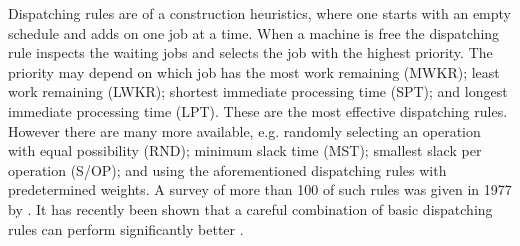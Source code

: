 \documentclass[10pt]{llncs}
\begin{document}

Dispatching rules are of a construction heuristics, where one starts with an empty schedule and adds on one job at a time. When a machine is free the dispatching rule inspects the waiting jobs and selects the job with the highest priority. The priority may depend on which job has the most work remaining (MWKR); least work remaining (LWKR); shortest immediate processing time (SPT); and longest immediate processing time (LPT). These are the most effective dispatching rules. However there are many more available, e.g. randomly selecting an operation with equal possibility (RND); minimum slack time (MST); smallest slack per operation (S/OP); and using the aforementioned dispatching rules with predetermined weights. A survey of more than 100 of such rules was given in 1977 by \cite{Panwalkar1977a}. It has recently been shown that a careful combination of basic dispatching rules can perform significantly better \cite{Jayamohan2004}.

\end{document}
